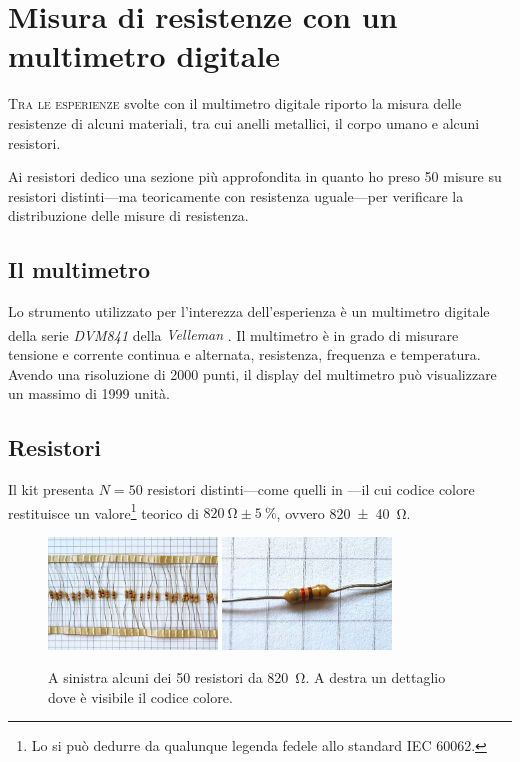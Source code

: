 \chapter{Misura di resistenze con un multimetro digitale}\label{ch:mult}
    \lettrine[loversize=0.08, lines=2]{T}{ra le esperienze} svolte con il multimetro digitale riporto la misura delle resistenze di alcuni materiali, tra cui anelli metallici, il corpo umano e alcuni resistori.

    Ai resistori dedico una sezione più approfondita in quanto ho preso \num{50} misure su resistori distinti---ma teoricamente con resistenza uguale---per verificare la distribuzione delle misure di resistenza.

    \section{Il multimetro}
        Lo strumento utilizzato per l'interezza dell'esperienza è un multimetro digitale della serie \emph{DVM841} della \emph{Velleman\textsuperscript{\textregistered}} \cite{velleman-dvm841}. Il multimetro è in grado di misurare tensione e corrente continua e alternata, resistenza, frequenza e temperatura. Avendo una risoluzione di \num{2000} punti, il display del multimetro può visualizzare un massimo di \num{1999} unità.
    \section{Resistori}
        Il kit presenta $N = \num{50}$ resistori distinti---come quelli in ---il cui codice colore restituisce un valore\footnote{Lo si può dedurre da qualunque legenda fedele allo standard IEC 60062.} teorico di $\SI{820}{\ohm} \pm \SI{5}{\%}$, ovvero \SI{820(40)}{\ohm}.
        \begin{figure}
            \centering
            \includegraphics[width=0.4\textwidth]{images/multimetro/resistori.jpg}
            \hspace{0.05\textwidth}
            \includegraphics[width=0.4\textwidth]{images/multimetro/resistore.jpg}
            \caption{A sinistra alcuni dei \num{50} resistori da \SI{820}{\ohm}. A destra un dettaglio dove è visibile il codice colore.}
            \label{fig:mul:resistore}
        \end{figure}

